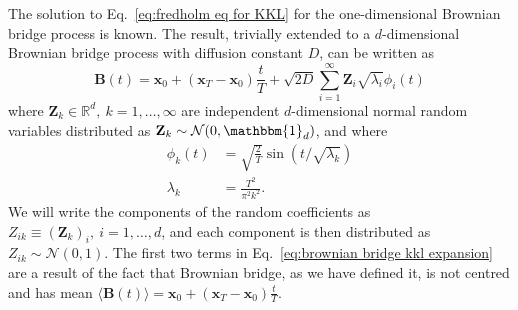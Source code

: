 The solution to Eq.~\ref{eq:fredholm eq for KKL} for the one-dimensional Brownian bridge process is known. The result, trivially extended to a $d$-dimensional Brownian bridge process with diffusion constant $D$, can be written as
\begin{equation} \label{eq:brownian bridge kkl expansion}
	\mathbf{B}(t) = \mathbf{x}_0 + (\mathbf{x}_T - \mathbf{x}_0) \frac{t}{T} +\sqrt{2 D} \sum_{i=1}^\infty \mathbf{Z}_i \sqrt{\lambda_i} \phi_i(t)
\end{equation}
where $\mathbf{Z}_k \in \mathbb{R}^d,\ k =1,\dots,\infty$ are independent $d$-dimensional normal random variables distributed as $\mathbf{Z}_k \sim \mathcal{N}(0, \mathbbm{1}_d)$, and where
\begin{subequations}
	\begin{align}
		\phi_k(t) & = \sqrt{\frac{2}{T}} \sin (t / \sqrt{\lambda_k}) \\
		\lambda_k & = \frac{T^2}{\pi^2 k^2} .
	\end{align}
\end{subequations}
We will write the components of the random coefficients as $Z_{ik} \equiv (\mathbf{Z}_k)_i,\ i=1,\dots,d$, and each component is then distributed as $Z_{ik} \sim \mathcal{N}(0, 1)$. The first two terms in Eq.~\ref{eq:brownian bridge kkl expansion} are a result of the fact that Brownian bridge, as we have defined it, is not centred and has mean $\langle \mathbf{B}(t) \rangle = \mathbf{x}_0 + (\mathbf{x}_T - \mathbf{x}_0) \frac{t}{T}$.

